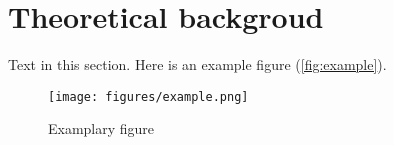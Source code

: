 \section{Theoretical backgroud}

Text in this section. Here is an example figure (\autoref{fig:example}).

\begin{figure}
\texttt{[image: figures/example.png]}
\caption{Examplary figure}
\label{fig:example}
\end{figure}
